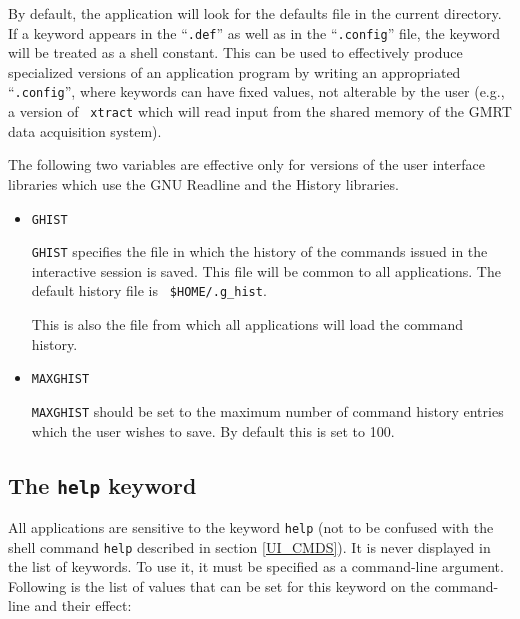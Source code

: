 \documentclass[11pt]{article}
\begin{document}
\begin{itemize}
  By default, the application will look for the defaults file in the
  current directory.  If a keyword appears in the ``{\tt.def}'' as
  well as in the ``{\tt .config}'' file, the keyword will be treated
  as a shell constant.  This can be used to effectively produce
  specialized versions of an application program by writing an
  appropriated ``{\tt .config}'', where keywords can have fixed
  values, not alterable by the user (e.g., a version of {\tt
    xtract} which will read input from the shared memory of the GMRT
  data acquisition system).

\end{itemize}

The following two variables are effective only for versions of the
user interface libraries which use the GNU Readline and the History
libraries.

\begin{itemize}
\item   {\tt GHIST}
  
  {\tt GHIST} specifies the file in which the history of the commands
  issued in the interactive session is saved.  This file will be
  common to all applications.  The default history file is {\tt
    \$HOME/.g\_hist}.
  
  This is also the file from which all applications will load the
  command history.

\item   {\tt MAXGHIST}
  
  {\tt MAXGHIST} should be set to the maximum number of command
  history entries which the user wishes to save.  By default this is
  set to 100.
\end{itemize}


\subsection{The {\tt help} keyword}

All applications are sensitive to the keyword {\tt help} (not to be
confused with the shell command {\tt help} described in section
\ref{UI_CMDS}).  It is never displayed in the list of keywords.  To
use it, it must be specified as a command-line argument.  Following is
the list of values that can be set for this keyword on the
command-line and their effect:
\end{document}
